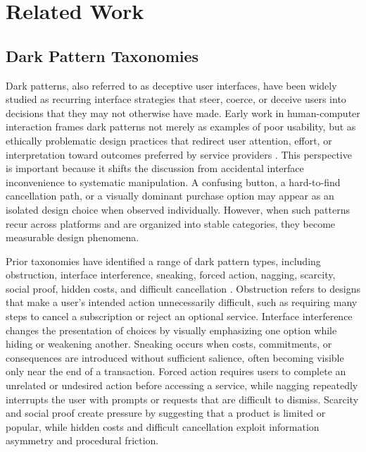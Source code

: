 \chapter{Related Work}

\section{Dark Pattern Taxonomies}

Dark patterns, also referred to as deceptive user interfaces, have been widely studied as recurring interface strategies that steer, coerce, or deceive users into decisions that they may not otherwise have made. Early work in human-computer interaction frames dark patterns not merely as examples of poor usability, but as ethically problematic design practices that redirect user attention, effort, or interpretation toward outcomes preferred by service providers \cite{gray2018darkpatterns}. This perspective is important because it shifts the discussion from accidental interface inconvenience to systematic manipulation. A confusing button, a hard-to-find cancellation path, or a visually dominant purchase option may appear as an isolated design choice when observed individually. However, when such patterns recur across platforms and are organized into stable categories, they become measurable design phenomena.

Prior taxonomies have identified a range of dark pattern types, including obstruction, interface interference, sneaking, forced action, nagging, scarcity, social proof, hidden costs, and difficult cancellation \cite{gray2018darkpatterns,mathur2019darkpatterns,mathur2021whatmakesdark}. Obstruction refers to designs that make a user’s intended action unnecessarily difficult, such as requiring many steps to cancel a subscription or reject an optional service. Interface interference changes the presentation of choices by visually emphasizing one option while hiding or weakening another. Sneaking occurs when costs, commitments, or consequences are introduced without sufficient salience, often becoming visible only near the end of a transaction. Forced action requires users to complete an unrelated or undesired action before accessing a service, while nagging repeatedly interrupts the user with prompts or requests that are difficult to dismiss. Scarcity and social proof create pressure by suggesting that a product is limited or popular, while hidden costs and difficult cancellation exploit information asymmetry and procedural friction.

